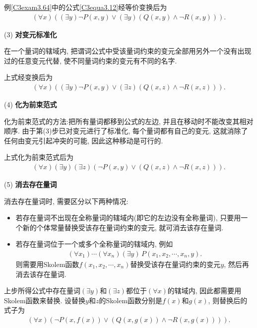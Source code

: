 \begin{example}
例\ref{C3exam3.64}中的公式\ref{C3equa3.12}经等价变换后为
\begin{align}
  (\forall x)((\exists  y)\neg P(x, y)\vee (\exists  y)(Q(x, y) \wedge \neg R(x, y))).
\end{align}
\end{example}

(3) \textbf{对变元标准化}

在一个量词的辖域内, 把谓词公式中受该量词约束的变元全部用另外一个没有出现过的任意变元代替, 使不同量词约束的变元有不同的名字.
\begin{example}
上式经变换后为
\begin{align}
  (\forall x)((\exists  y)\neg P(x, y)\vee (\exists  z)( Q(x, z) \wedge \neg R(x, z))).
\end{align}
\end{example}

(4) \textbf{化为前束范式}

化为前束范式的方法:把所有量词都移到公式的左边, 并且在移动时不能改变其相对顺序. 由于第(3)步已对变元进行了标准化, 每个量词都有自己的变元, 这就消除了任何由变元引起冲突的可能, 因此这种移动是可行的.

\begin{example}
上式化为前束范式后为
\begin{align}
  (\forall x)(\exists  y) (\exists  z)(\neg P(x, y)\vee ( Q(x, z) \wedge \neg R(x, z))).
\end{align}
\end{example}

(5) \textbf{消去存在量词}

消去存在量词时, 需要区分以下两种情况:
\begin{itemize}
\item 若存在量词不出现在全称量词的辖域内(即它的左边没有全称量词), 只要用一个新的个体常量替换受该存在量词约束的变元, 就可消去该存在量词.

\item 若存在量词位于一个或多个全称量词的辖域内, 例如
\begin{align}
    (\forall x_1)\cdots(\forall x_n) (\exists  y)\,P(x_1, x_2 ,\cdots, x_n ,y).
\end{align}
则需要用Skolem函数$f(x_1,x_2,\cdots, x_n)$替换受该存在量词约束的变元$y$, 然后再消去该存在量词.
\end{itemize}
\begin{example}
    上步所得公式中存在量词$(\exists  y)$和$(\exists  z)$都位于$(\forall x)$的辖域内, 因此都需要用Skolem函数来替换. 设替换$y$和$z$的Skolem函数分别是$f(x)$和$g(x)$, 则替换后的式子为
\begin{align}
  (\forall x)(\neg P(x,f(x))\vee (Q(x,g(x))\wedge \neg R(x,g(x)))).
\end{align}
\end{example}

